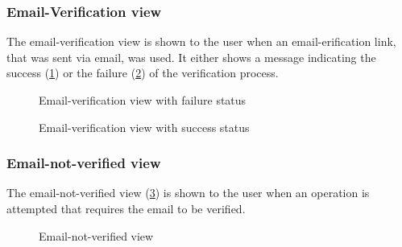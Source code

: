 \subsubsection{Email-Verification view}
The email-verification view is shown to the user when an email-erification link, that was sent via email, was used.
It either shows a message indicating the success (\ref{fig:web-email-verification-error}) or the failure (\ref{fig:web-email-verification-success}) of the verification process.

\begin{figure}
    \centering

    \caption{Email-verification view with failure status}
    \label{fig:web-email-verification-error}
\end{figure}
\begin{figure}
    \centering


    \caption{Email-verification view with success status}
    \label{fig:web-email-verification-success}
\end{figure}

\subsubsection{Email-not-verified view}
The email-not-verified view (\ref{fig:web-email-not-verified}) is shown to the user when an operation is attempted that requires the email to be verified.

\begin{figure}
    \centering

    \caption{Email-not-verified view}
    \label{fig:web-email-not-verified}
\end{figure}